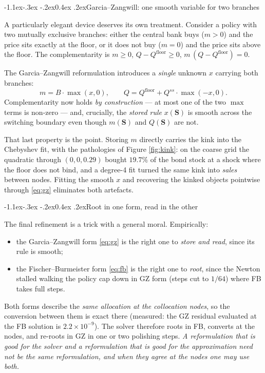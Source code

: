 \documentclass[10pt,a4paper]{article}
\makeatletter
\theoremstyle{definition}
\theoremstyle{plain}
\theoremstyle{remark}
\newcommand{\st}{\mathbf{S}}
\renewcommand\subsection{\@startsection{subsection}{2}{\z@}%
  {-1.1ex\@plus -.3ex \@minus -.2ex}{0.4ex \@plus .2ex}{\normalfont\normalsize\bfseries}}
\makeatother
\begin{document}
\subsection{Garcia--Zangwill: one smooth variable for two branches}
\label{sec:gz}

A particularly elegant device deserves its own treatment. Consider a policy with two
mutually exclusive branches: either the central bank buys ($m>0$) and the price sits exactly
at the floor, or it does not buy ($m=0$) and the price sits above the floor. The
complementarity is $m\ge0$, $Q-Q^{\mathrm{floor}}\ge0$, $m\,(Q-Q^{\mathrm{floor}})=0$.

The Garcia--Zangwill reformulation introduces a \emph{single} unknown $x$ carrying both
branches:
\begin{equation}
  \boxed{\;m = B\cdot\max(x,0),\qquad Q = Q^{\mathrm{floor}} + Q^{ss}\cdot\max(-x,0).\;}
  \label{eq:gz}
\end{equation}
Complementarity now holds \emph{by construction} --- at most one of the two $\max$ terms is
non-zero --- and, crucially, the \emph{stored rule} $x(\st)$ is smooth across the switching
boundary even though $m(\st)$ and $Q(\st)$ are not.

That last property is the point. Storing $m$ directly carries the kink into the Chebyshev
fit, with the pathologies of Figure \ref{fig:kink}: on the coarse grid the quadratic through
$(0,0,0.29)$ bought $19.7\%$ of the bond stock at a shock where the floor does not bind, and a
degree-4 fit turned the same kink into \emph{sales} between nodes. Fitting the smooth $x$ and
recovering the kinked objects pointwise through \eqref{eq:gz} eliminates both artefacts.

\subsection{Root in one form, read in the other}

The final refinement is a trick with a general moral. Empirically:
\begin{itemize}
\item the Garcia--Zangwill form \eqref{eq:gz} is the right one to \emph{store and read}, since
its rule is smooth;
\item the Fischer--Burmeister form \eqref{eq:fb} is the right one to \emph{root}, since the
Newton stalled walking the policy cap down in GZ form (steps cut to $1/64$) where FB takes
full steps.
\end{itemize}
Both forms describe the \emph{same allocation at the collocation nodes}, so the conversion
between them is exact there (measured: the GZ residual evaluated at the FB solution is
$2.2\times10^{-9}$). The solver therefore roots in FB, converts at the nodes, and re-roots in
GZ in one or two polishing steps. \emph{A reformulation that is good for the solver and a
reformulation that is good for the approximation need not be the same reformulation, and when
they agree at the nodes one may use both.}
\end{document}
